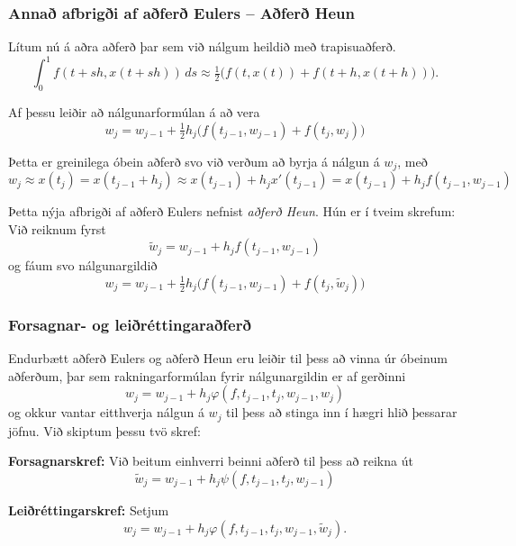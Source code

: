 \documentclass[icelandic,a4paper,12pt]{article}
\begin{document}
\subsubsection{Annað afbrigði af aðferð Eulers -- Aðferð Heun} 
Lítum nú á aðra aðferð þar sem við nálgum heildið með trapisuaðferð. 
$$
\int_0^1f(t+sh,x(t+sh))\, ds \approx 
\tfrac 12 \big(f(t,x(t))+f(t+h,x(t+h))\big). 
$$

\pause
\smallskip
Af þessu leiðir að nálgunarformúlan á að vera
$$
w_j=w_{j-1}+\tfrac 12h_j\big(f(t_{j-1},w_{j-1})+f(t_j,w_j)\big)
$$

\pause
Þetta er greinilega óbein aðferð svo við verðum að byrja á 
nálgun á $w_j$, með
$$
w_j\approx x(t_j)=x(t_{j-1}+h_j)\approx x(t_{j-1})+h_jx'(t_{j-1})
=x(t_{j-1})+h_jf(t_{j-1},w_{j-1}) 
$$

\smallskip
Þetta nýja afbrigði af aðferð Eulers nefnist {\it aðferð Heun}.
Hún er í tveim skrefum:  Við reiknum fyrst
\begin{equation*}
  \tilde w_j = w_{j-1} + h_jf(t_{j-1},w_{j-1})
\end{equation*}
og fáum svo nálgunargildið
\begin{equation*}
  w_j = w_{j-1} + \tfrac 12h_j
\big(f(t_{j-1},w_{j-1})+f(t_j,\tilde w_j)\big)
\end{equation*}



\subsubsection{Forsagnar- og leiðréttingaraðferð} 
Endurbætt aðferð  Eulers og  aðferð Heun eru leiðir til þess að vinna
úr óbeinum aðferðum, þar sem rakningarformúlan fyrir nálgunargildin er
af gerðinni
$$
w_j=w_{j-1}+h_j\varphi(f,t_{j-1},t_j,w_{j-1},w_j)
$$
og okkur vantar eitthverja nálgun á $w_j$ til þess að stinga inn í
hægri hlið þessarar jöfnu.  Við skiptum þessu tvö skref:

\pause
\smallskip
{\bf Forsagnarskref:}   Við beitum einhverri beinni aðferð til þess að
reikna út 
$$
\tilde w_j=w_{j-1}+h_j\psi(f,t_{j-1},t_j,w_{j-1})
$$

\pause
\smallskip
{\bf Leiðréttingarskref:} Setjum
$$
w_j=w_{j-1}+h_j\varphi(f,t_{j-1},t_j,w_{j-1},\tilde w_j).
$$
\end{document}
